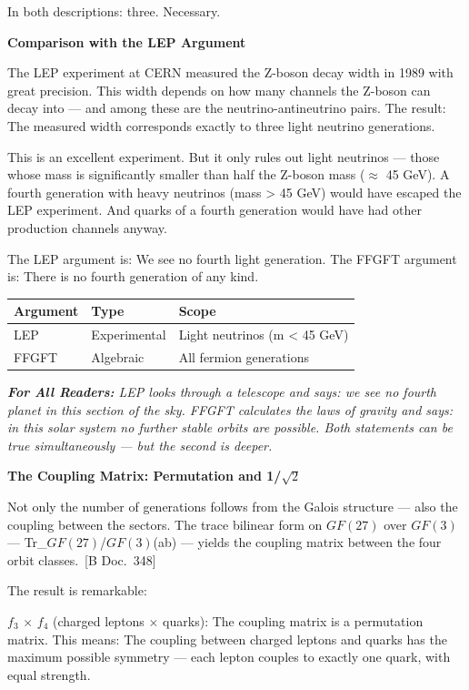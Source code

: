 \documentclass[11pt,oneside]{book}
\newcommand{\status}[1]{\penalty10000\,{\scriptsize\textcolor{gray!60}{[#1]}}}
\newenvironment{laierspur}{%
  \par\vspace{4pt}%
  \noindent\small\itshape\color{blue!60!black}%
  \textbf{For All Readers:}\enspace\ignorespaces}{%
  \par\vspace{4pt}\normalsize\normalfont\normalcolor}
\begin{document}
In both descriptions: three. Necessary.

\textbf{Comparison with the LEP Argument}

The LEP experiment at CERN measured the Z-boson decay width in 1989 with
great precision. This width depends on how many channels the Z-boson can
decay into — and among these are the neutrino-antineutrino pairs. The
result: The measured width corresponds exactly to three light neutrino
generations.

This is an excellent experiment. But it only rules out light neutrinos —
those whose mass is significantly smaller than half the Z-boson mass
($\approx$ 45 GeV). A fourth generation with heavy neutrinos (mass > 45 GeV) would
have escaped the LEP experiment. And quarks of a fourth generation would
have had other production channels anyway.

The LEP argument is: We see no fourth light generation.
The FFGFT argument is: There is no fourth generation of any kind.

\begin{center}
\small
\begin{tabular}{lp{1.5cm}p{3.5cm}}
\toprule
Argument & Type & Scope \\
\midrule
LEP & Experimental & Light neutrinos (m < 45 GeV) \\
FFGFT & Algebraic & All fermion generations \\
\bottomrule
\end{tabular}
\end{center}

\begin{laierspur}
LEP looks through a telescope and says: we see no fourth planet in this
section of the sky. FFGFT calculates the laws of gravity and says: in this
solar system no further stable orbits are possible. Both statements can be
true simultaneously — but the second is deeper.
\end{laierspur}

\textbf{The Coupling Matrix: Permutation and 1/$\sqrt{2}$}

Not only the number of generations follows from the Galois structure —
also the coupling between the sectors. The trace bilinear form on $GF(27)$
over $GF(3)$ — Tr\_{$GF(27)$/$GF(3)$}(ab) — yields the coupling matrix between
the four orbit classes. \status{B Doc.~348}

The result is remarkable:

$f_3$ $\times$ $f_4$ (charged leptons $\times$ quarks): The coupling matrix is a
permutation matrix. This means: The coupling between charged leptons and
quarks has the maximum possible symmetry — each lepton couples to exactly
one quark, with equal strength.
\end{document}
